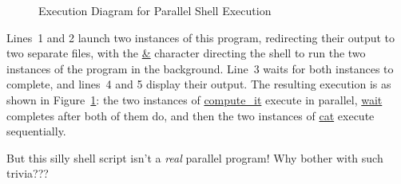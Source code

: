 \begin{figure}[tb]
\begin{center}
\end{center}
\caption{Execution Diagram for Parallel Shell Execution}
\label{fig:intro:Execution Diagram for Parallel Shell Execution}
\end{figure}

Lines~1 and 2 launch two instances of this program, redirecting their
output to two separate files, with the \url{&} character directing the
shell to run the two instances of the program in the background.
Line~3 waits for both instances to complete, and lines~4 and 5
display their output.
The resulting execution is as shown in
Figure~\ref{fig:intro:Execution Diagram for Parallel Shell Execution}:
the two instances of \url{compute_it} execute in parallel,
\url{wait} completes after both of them do, and then the two instances
of \url{cat} execute sequentially.

\QuickQuiz{}
	But this silly shell script isn't a \emph{real} parallel program!
	Why bother with such trivia???
 \QuickQuizEnd

